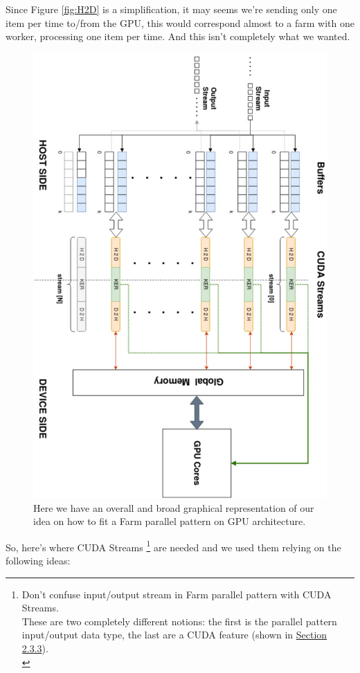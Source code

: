 	Since Figure \ref{fig:H2D} is a simplification, it may seems we're sending only one item per time to/from the GPU, this would correspond almost to a farm with one worker, processing one item per time. And this isn't completely what we wanted.\\
	\begin{figure}
		\vspace{-2cm}
		\includegraphics[scale=0.62,angle=-90]{images/overallLogic.jpg}
		\caption{Here we have an overall and broad graphical representation of our idea on how to fit a Farm parallel pattern on GPU architecture.}
		\label{fig:overallLogic}
	\end{figure}
	So, here's where CUDA Streams \footnote{Don't confuse input/output stream in Farm parallel pattern with CUDA Streams.\\ These are two completely different notions: the first is the parallel pattern input/output data type, the last are a CUDA feature (shown in \hyperref[subs:streams]{Section 2.3.3}).\\} are needed and we used them relying on the following ideas:
